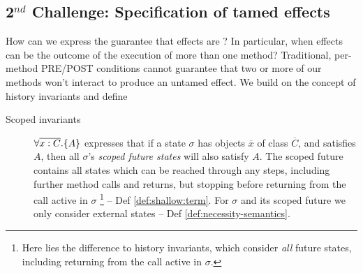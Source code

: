 \subsection{2$^{nd}$ Challenge: Specification of tamed effects}
\label{sect:approach:scoped}
How can we express the guarantee that effects are \tamed?  
 In particular, when effects can be the outcome of the execution of more than one method? 
 Traditional,  {per-method} PRE/POST conditions {cannot guarantee} %
  that two or more of our methods won't interact to produce an untamed effect. 
We build on the concept of history invariants \cite{liskov94behavioral,usinghistory,Cohen10} and define

\begin{description}
\item[{Scoped invariants}]  
{$\forall {\overline{x:C}}.{{\{}}{A}{{\}}}$} expresses that if a {state} $\sigma$ 
 has objects $\overline x$ of class $\overline C$, and satisfies $A$, then all $\sigma$'s \emph{scoped  future  states} will  {also} satisfy  {$A$}. 
The scoped future contains all %
 states which can be reached through any steps, including further method calls and returns, but stopping before returning  from the call active in $\sigma$ \footnote{{Here lies the difference to history invariants, which consider \emph{all} future states, including returning from the call active in $\sigma$.}}  --  \cf Def  \ref{def:shallow:term}.
{For} $\sigma$ and its scoped future   we only consider external states -- \cf Def \ref{def:necessity-semantics}.
\end{description}

    
\label{s:bank}




